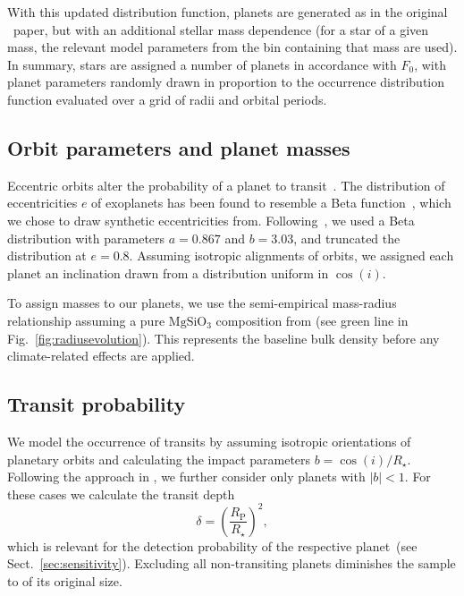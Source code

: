 \documentclass[twocolumn,twocolappendix]{aastex631}
\begin{document}
With this updated distribution function, planets are generated as in the original \bioverse\ paper, but with an additional stellar mass dependence (for a star of a given mass, the relevant model parameters from the bin containing that mass are used). In summary, stars are assigned a number of planets in accordance with $F_0$, with planet parameters randomly drawn in proportion to the occurrence distribution function evaluated over a grid of radii and orbital periods.

\subsection{Orbit parameters and planet masses}\label{sec:met-orbits_masses}
Eccentric orbits alter the probability of a planet to transit~\citep[e.g.,][]{Barnes2007a}.
The distribution of eccentricities $e$ of exoplanets has been found to resemble a Beta function~\citep{Kipping2013b}, which we chose to draw synthetic eccentricities from.
Following~\citet{Kipping2013b}, we used a Beta distribution with parameters $a=0.867$ and $b=3.03$, and truncated the distribution at $e = 0.8$.
Assuming isotropic alignments of orbits, we assigned each planet an inclination drawn from a distribution uniform in $\cos(i)$.

To assign masses to our planets, we use the semi-empirical mass-radius relationship assuming a pure $\mathrm{MgSiO_3}$ composition from \citet{Zeng2016} (see green line in Fig.~\ref{fig:radiusevolution}).
This represents the baseline bulk density before any climate-related effects are applied.


\subsection{Transit probability}
We model the occurrence of transits by assuming isotropic orientations of planetary orbits and calculating the impact parameters $b = \cos(i)/R_\star$.
Following the approach in \citet{Bixel2021}, we further consider only planets with $|b| < 1$.
For these cases we calculate the transit depth
\begin{equation}\label{eq:transitdepth}
    \delta = \left( \frac{R_\mathrm{P}}{R_\star} \right)^2,
\end{equation}
which is relevant for the detection probability of the respective planet~(see Sect.~\ref{sec:sensitivity}).
Excluding all non-transiting planets diminishes the sample to  of its original size.
\end{document}
